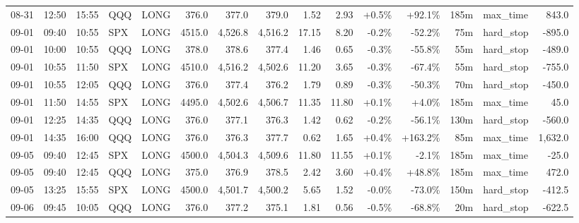 \documentclass[11pt,a4paper,twoside]{article}
\begin{document}
\begin{landscape}
\begin{center}
\begin{longtable}{>{\color{txtmain}}l l l l l r r r r r r r r >{\color{txtmain}}l r}
08-31 & 12:50 & 15:55 & QQQ & LONG & 376.0 & 377.0 & 379.0 & 1.52 & 2.93 & \textcolor{wingreen}{+0.5\%} & \textcolor{wingreen}{+92.1\%} & 185m & max\_time & \textcolor{wingreen}{843.0} \\
09-01 & 09:40 & 10:55 & SPX & LONG & 4515.0 & 4,526.8 & 4,516.2 & 17.15 & 8.20 & \textcolor{lossred}{-0.2\%} & \textcolor{lossred}{-52.2\%} & 75m & hard\_stop & \textcolor{lossred}{-895.0} \\
09-01 & 10:00 & 10:55 & QQQ & LONG & 378.0 & 378.6 & 377.4 & 1.46 & 0.65 & \textcolor{lossred}{-0.3\%} & \textcolor{lossred}{-55.8\%} & 55m & hard\_stop & \textcolor{lossred}{-489.0} \\
09-01 & 10:55 & 11:50 & SPX & LONG & 4510.0 & 4,516.2 & 4,502.6 & 11.20 & 3.65 & \textcolor{lossred}{-0.3\%} & \textcolor{lossred}{-67.4\%} & 55m & hard\_stop & \textcolor{lossred}{-755.0} \\
09-01 & 10:55 & 12:05 & QQQ & LONG & 376.0 & 377.4 & 376.2 & 1.79 & 0.89 & \textcolor{lossred}{-0.3\%} & \textcolor{lossred}{-50.3\%} & 70m & hard\_stop & \textcolor{lossred}{-450.0} \\
09-01 & 11:50 & 14:55 & SPX & LONG & 4495.0 & 4,502.6 & 4,506.7 & 11.35 & 11.80 & \textcolor{wingreen}{+0.1\%} & \textcolor{wingreen}{+4.0\%} & 185m & max\_time & \textcolor{wingreen}{45.0} \\
09-01 & 12:25 & 14:35 & QQQ & LONG & 376.0 & 377.1 & 376.3 & 1.42 & 0.62 & \textcolor{lossred}{-0.2\%} & \textcolor{lossred}{-56.1\%} & 130m & hard\_stop & \textcolor{lossred}{-560.0} \\
09-01 & 14:35 & 16:00 & QQQ & LONG & 376.0 & 376.3 & 377.7 & 0.62 & 1.65 & \textcolor{wingreen}{+0.4\%} & \textcolor{wingreen}{+163.2\%} & 85m & max\_time & \textcolor{wingreen}{1,632.0} \\
09-05 & 09:40 & 12:45 & SPX & LONG & 4500.0 & 4,504.3 & 4,509.6 & 11.80 & 11.55 & \textcolor{wingreen}{+0.1\%} & \textcolor{lossred}{-2.1\%} & 185m & max\_time & \textcolor{lossred}{-25.0} \\
09-05 & 09:40 & 12:45 & QQQ & LONG & 375.0 & 376.9 & 378.5 & 2.42 & 3.60 & \textcolor{wingreen}{+0.4\%} & \textcolor{wingreen}{+48.8\%} & 185m & max\_time & \textcolor{wingreen}{472.0} \\
09-05 & 13:25 & 15:55 & SPX & LONG & 4500.0 & 4,501.7 & 4,500.2 & 5.65 & 1.52 & \textcolor{lossred}{-0.0\%} & \textcolor{lossred}{-73.0\%} & 150m & hard\_stop & \textcolor{lossred}{-412.5} \\
09-06 & 09:45 & 10:05 & QQQ & LONG & 376.0 & 377.2 & 375.1 & 1.81 & 0.56 & \textcolor{lossred}{-0.5\%} & \textcolor{lossred}{-68.8\%} & 20m & hard\_stop & \textcolor{lossred}{-622.5} \\

\end{longtable}
\end{center}
\end{landscape}
\end{document}
